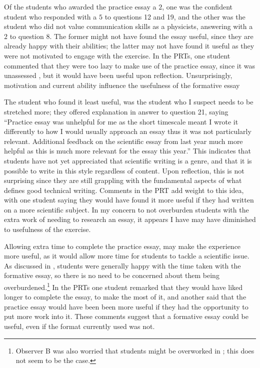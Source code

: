 Of the students who awarded the practice essay a $2$, one was the confident student who responded with a $5$ to questions 12 and 19, and the other was the student who did not value communication skills as a physicists, answering with a $2$ to question 8. The former might not have found the essay useful, since they are already happy with their abilities; the latter may not have found it useful as they were not motivated to engage with the exercise. In the PRTs, one student commented that they were too lazy to make use of the practice essay, since it was unassessed \citep[chapter 1]{Irons2008}, but it would have been useful upon reflection. Unsurprisingly, motivation and current ability influence the usefulness of the formative essay

The student who found it least useful, was the student who I suspect needs to be stretched more; they offered explanation in answer to question 21, saying ``Practice essay was unhelpful for me as the short timescale meant I wrote it differently to how I would usually approach an essay thus it was not particularly relevant. Additional feedback on the scientific essay from last year much more helpful as this is much more relevant for the essay this year.'' This indicates that students have not yet appreciated that scientific writing is a genre, and that it is possible to write in this style regardless of content. Upon reflection, this is not surprising since they are still grappling with the fundamental aspects of what defines good technical writing. Comments in the PRT add weight to this idea, with one student saying they would have found it more useful if they had written on a more scientific subject. In my concern to not overburden students with the extra work of needing to research an essay, it appears I have may have diminished to usefulness of the exercise.

Allowing extra time to complete the practice essay, may make the experience more useful, as it would allow more time for students to tackle a scientific issue. As discussed in , students were generally happy with the time taken with the formative essay, so there is no need to be concerned about them being overburdened.\footnote{Observer B was also worried that students might be overworked in ; this does not seem to be the case.} In the PRTs one student remarked that they would have liked longer to complete the essay, to make the most of it, and another said that the practice essay would have been been more useful if they had the opportunity to put more work into it. These comments suggest that a formative essay could be useful, even if the format currently used was not.

